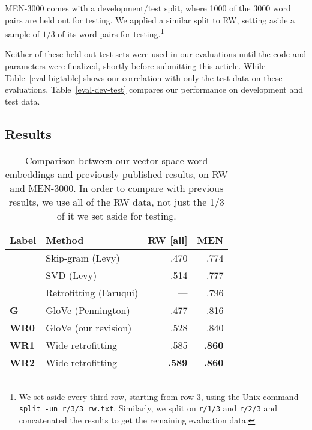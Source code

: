 \documentclass[11pt,letterpaper]{article}
\begin{document}
MEN-3000 comes with a development/test split, where 1000 of the 3000 word pairs
are held out for testing. We applied a similar split to RW, setting aside a
sample of $1/3$ of its word pairs for testing.\footnote{
    We set aside every third row, starting from row 3, using the Unix command
    {\tt split -un r/3/3 rw.txt}. Similarly, we split on {\tt r/1/3} and
    {\tt r/2/3} and concatenated the results to get the remaining evaluation
    data.
}

Neither of these held-out test sets were used in our evaluations until the code
and parameters were finalized, shortly before submitting this article. While
Table~\ref{eval-bigtable} shows our correlation with only the test data on these
evaluations, Table~\ref{eval-dev-test} compares our performance on development
and test data.

\subsection{Results}

\begin{table}[t]
\centering
\begin{tabular}{llrr}
\toprule
Label     & Method                 & RW [all] &      MEN \\
\midrule
          & Skip-gram (Levy)       &     .470 &     .774 \\
          & SVD (Levy)             &     .514 &     .777 \\
          & Retrofitting (Faruqui) &      --- &     .796 \\
\bf G     & GloVe (Pennington)     &     .477 &     .816 \\
\bf WR0   & GloVe (our revision)   &     .528 &     .840 \\
\bf WR1   & Wide retrofitting      &     .585 &{\bf .860}\\
\bf WR2   & Wide retrofitting      &{\bf .589}&{\bf .860}\\
\bottomrule
\end{tabular}

\caption{
    Comparison between our vector-space word embeddings and previously-published
    results, on RW and MEN-3000. In order to compare with previous results, we
    use all of the RW data, not just the 1/3 of it we set aside for testing.
}
\label{compare-others}
\end{table}
\end{document}
